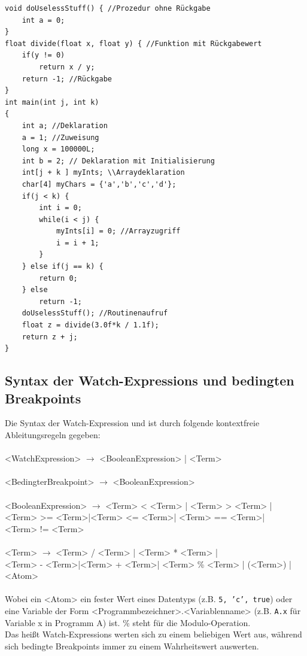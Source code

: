 \documentclass[parskip=full]{scrartcl}
\let\glsplgen\glsuseri
\begin{document}
\begin{verbatim}
void doUselessStuff() { //Prozedur ohne Rückgabe
    int a = 0;
}
float divide(float x, float y) { //Funktion mit Rückgabewert
    if(y != 0)	
        return x / y;
    return -1; //Rückgabe
}
int main(int j, int k)
{
    int a; //Deklaration
    a = 1; //Zuweisung
    long x = 100000L; 
    int b = 2; // Deklaration mit Initialisierung
    int[j + k ] myInts; \\Arraydeklaration
    char[4] myChars = {'a','b','c','d'};
    if(j < k) {
        int i = 0;
        while(i < j) {
            myInts[i] = 0; //Arrayzugriff
            i = i + 1;
        }	
    } else if(j == k) {
        return 0;
    } else
        return -1;
    doUselessStuff(); //Routinenaufruf
    float z = divide(3.0f*k / 1.1f);
    return z + j;
}
\end{verbatim}
\newpage
\subsection{Syntax der Watch-Expressions und bedingten Breakpoints}
Die Syntax der \gls{Watch-Expression} und \glsplgen{bedingter Breakpoint} ist durch folgende kontextfreie Ableitungsregeln gegeben: \\\\
<WatchExpression> $\rightarrow$ <BooleanExpression> | <Term>\\\\
<BedingterBreakpoint> $\rightarrow$ <BooleanExpression>\\\\<BooleanExpression> $\rightarrow$ <Term> < <Term> 
| <Term> > <Term> |\\ <Term> >= <Term>|<Term> <= <Term>| <Term> == <Term>| \\<Term> != <Term>\\\\
<Term> $\rightarrow$ <Term> / <Term> 
| <Term> * <Term> |\\ <Term> - <Term>|<Term> + <Term>| <Term> \% <Term> | (<Term>) |<Atom>\\\\

Wobei ein <Atom> ein fester Wert eines Datentyps (z.B. \texttt{5, 'c', true}) oder eine Variable der Form <Programmbezeichner>.<Variablenname> (z.B. \texttt{A.x} für Variable x in Programm A) ist. \% steht für die Modulo-Operation.\\
Das heißt Watch-Expressions werten sich zu einem beliebigen Wert aus, während sich bedingte Breakpoints immer zu einem Wahrheitswert auswerten.


\newpage
\printglossary[style=altlist, toctitle=Glossar]
\end{document}
